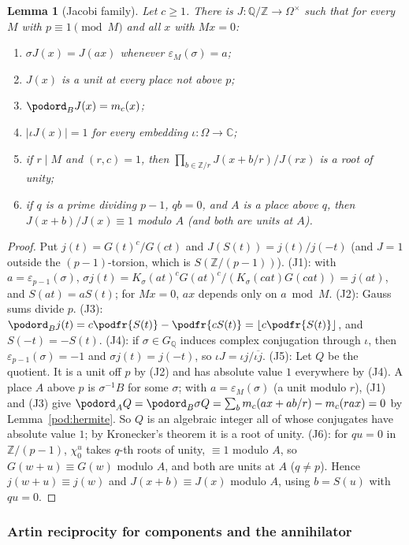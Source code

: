 \documentclass[10pt]{amsart}
\newtheorem{lemma}[theorem]{Lemma}
\theoremstyle{definition}
\theoremstyle{remark}
\newcommand{\C}{\mathbb C}
\newcommand{\Z}{\mathbb Z}
\newcommand{\Q}{\mathbb Q}
\begin{document}
\begin{lemma}[Jacobi family]\label{pod:J}
Let $c\ge1$. There is $J\colon\Q/\Z\to\Omega^\times$ such that for every $M$ with $p\equiv1\pmod M$
and all $x$ with $Mx=0$:
\begin{enumerate}
\item[(J1)] $\sigma J(x)=J(ax)$ whenever $\varepsilon_M(\sigma)=a$;
\item[(J2)] $J(x)$ is a unit at every place not above $p$;
\item[(J3)] $\podord_BJ(x)=m_c(x)$;
\item[(J4)] $|\iota J(x)|=1$ for every embedding $\iota\colon\Omega\to\C$;
\item[(J5)] if $r\mid M$ and $(r,c)=1$, then $\prod_{b\in\Z/r}J(x+b/r)\big/J(rx)$ is a root of unity;
\item[(J6)] if $q$ is a prime dividing $p-1$, $qb=0$, and $A$ is a place above $q$, then
$J(x+b)/J(x)\equiv1$ modulo $A$ \textup(and both are units at $A$\textup).
\end{enumerate}
\end{lemma}
\begin{proof}
Put $j(t)=G(t)^c/G(ct)$ and $J(S(t))=j(t)/j(-t)$ (and $J=1$ outside the $(p-1)$-torsion, which is
$S(\Z/(p-1))$). (J1): with $a=\varepsilon_{p-1}(\sigma)$, $\sigma j(t)=K_\sigma(at)^cG(at)^c/
(K_\sigma(cat)G(cat))=j(at)$, and $S(at)=aS(t)$; for $Mx=0$, $ax$ depends only on $a\bmod M$.
(J2): Gauss sums divide $p$. (J3): $\podord_Bj(t)=c\podfr{S(t)}-\podfr{cS(t)}=\lfloor c\podfr{S(t)}
\rfloor$, and $S(-t)=-S(t)$. (J4): if $\sigma\in G_\Q$ induces complex conjugation through $\iota$,
then $\varepsilon_{p-1}(\sigma)=-1$ and $\sigma j(t)=j(-t)$, so $\iota J=\iota j/\overline{\iota j}$.
(J5): Let $Q$ be the quotient. It is a unit off $p$ by (J2) and has absolute value $1$ everywhere by
(J4). A place $A$ above $p$ is $\sigma^{-1}B$ for some $\sigma$; with $a=\varepsilon_M(\sigma)$ (a unit
modulo $r$), (J1) and (J3) give $\podord_A Q=\podord_B\sigma Q=\sum_bm_c(ax+ab/r)-m_c(rax)=0$ by
Lemma~\ref{pod:hermite}. So $Q$ is an algebraic integer all of whose conjugates have absolute value
$1$; by Kronecker's theorem it is a root of unity. (J6): for $qu=0$ in $\Z/(p-1)$, $\chi_0^u$ takes
$q$-th roots of unity, $\equiv1$ modulo $A$, so $G(w+u)\equiv G(w)$ modulo $A$, and both are units at
$A$ ($q\ne p$). Hence $j(w+u)\equiv j(w)$ and $J(x+b)\equiv J(x)$ modulo $A$, using $b=S(u)$ with
$qu=0$.
\end{proof}

\subsubsection{Artin reciprocity for components and the annihilator}\label{pod:ss-annih}
\end{document}
